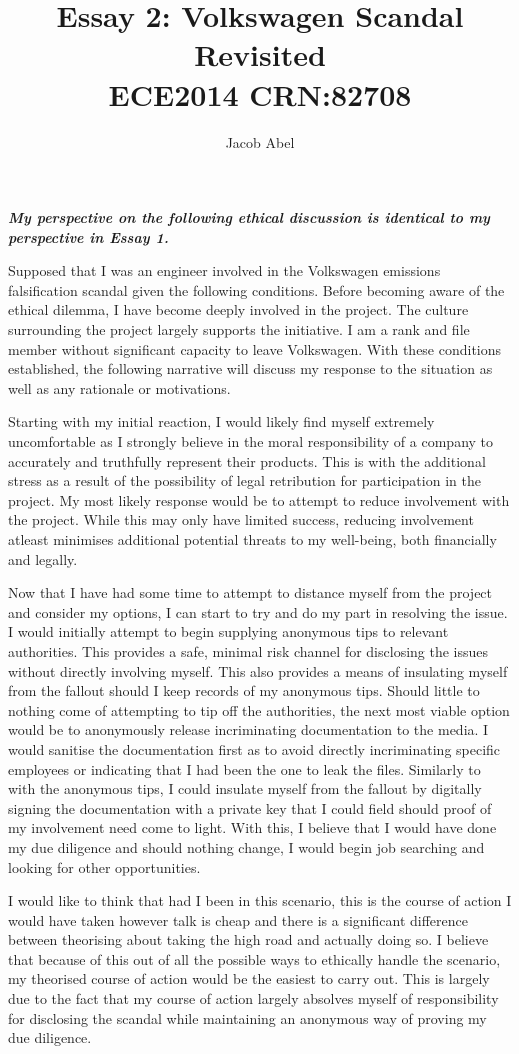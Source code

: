 \documentclass[12pt,letterpaper,titlepage]{report}
\author{Jacob Abel}
\title{%
	Essay 2: Volkswagen Scandal Revisited
	\\\large ECE2014 CRN:82708
}
\begin{document}
\maketitle
{} 

\textbf{\emph{My perspective on the following ethical discussion is identical to my perspective in Essay 1.}}\bigskip

Supposed that I was an engineer involved in the Volkswagen emissions falsification scandal given the following conditions. Before becoming aware of the ethical dilemma, I have become deeply involved in the project. The culture surrounding the project largely supports the initiative. I am a rank and file member without significant capacity to leave Volkswagen. With these conditions established, the following narrative will discuss my response to the situation as well as any rationale or motivations.

Starting with my initial reaction, I would likely find myself extremely uncomfortable as I strongly believe in the moral responsibility of a company to accurately and truthfully represent their products. This is with the additional stress as a result of the possibility of legal retribution for participation in the project. My most likely response would be to attempt to reduce involvement with the project. While this may only have limited success, reducing involvement atleast minimises additional potential threats to my well-being, both financially and legally.

Now that I have had some time to attempt to distance myself from the project and consider my options, I can start to try and do my part in resolving the issue. I would initially attempt to begin supplying anonymous tips to relevant authorities. This provides a safe, minimal risk channel for disclosing the issues without directly involving myself. This also provides a means of insulating myself from the fallout should I keep records of my anonymous tips. Should little to nothing come of attempting to tip off the authorities, the next most viable option would be to anonymously release incriminating documentation to the media. I would sanitise the documentation first as to avoid directly incriminating specific employees or indicating that I had been the one to leak the files. Similarly to with the anonymous tips, I could insulate myself from the fallout by digitally signing the documentation with a private key that I could field should proof of my involvement need come to light. With this, I believe that I would have done my due diligence and should nothing change, I would begin job searching and looking for other opportunities.

I would like to think that had I been in this scenario, this is the course of action I would have taken however talk is cheap and there is a significant difference between theorising about taking the high road and actually doing so. I believe that because of this out of all the possible ways to ethically handle the scenario, my theorised course of action would be the easiest to carry out. This is largely due to the fact that my course of action largely absolves myself of responsibility for disclosing the scandal while maintaining an anonymous way of proving my due diligence. 
\end{document}
